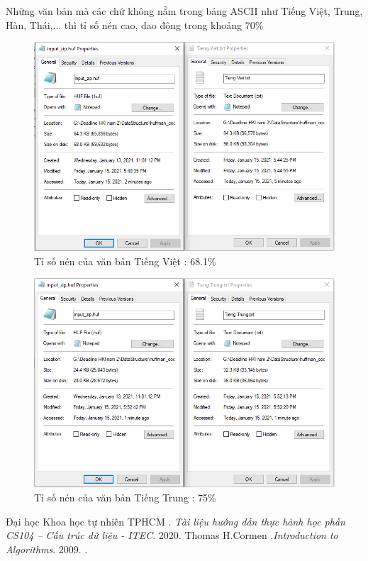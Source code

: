 \documentclass[14pt]{extreport}
\begin{document}
Những văn bản mà các chứ không nằm trong bảng ASCII như Tiếng Việt, Trung, Hàn, Thái,... thì tỉ số nén cao, dao động trong khoảng 70\%
\begin{center}
    \begin{figure}[H]
    \begin{center}
     \includegraphics[scale=1]{tisonen_TiengViet.PNG}
    \end{center}
    \caption{Tỉ số nén của văn bản Tiếng Việt : 68.1\%}
    \label{refhinh1}
    \end{figure}
\end{center}

\begin{center}
    \begin{figure}[H]
    \begin{center}
     \includegraphics[scale=1]{tisonen_TiengTrung.PNG}
    \end{center}
    \caption{Tỉ số nén của văn bản Tiếng Trung : 75\%}
    \label{refhinh1}
    \end{figure}
\end{center}

\begin{thebibliography}{3}
Đại học Khoa học tự nhiên TPHCM . {\it Tài liệu hướng dẫn thực hành học phần CS104 – Cấu trúc dữ liệu - ITEC}. 2020.
Thomas H.Cormen  .{\it  Introduction to Algorithms}. 2009.
.

\end{thebibliography}
\end{document}
